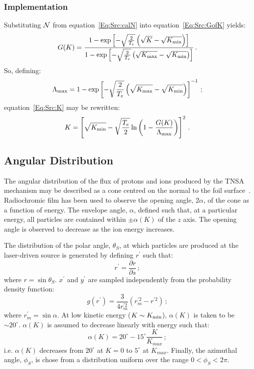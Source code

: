 \subsubsection{Implementation}
Substituting ${\cal N}$ from equation~\ref{Eq:Src:calN} into
equation~\ref{Eq:Src:GofK} yields:
\begin{equation}
  G(K) =
  \frac{1-\exp\left[-\sqrt{\frac{2}{T_e}}\left(\sqrt{K}-\sqrt{K_{\rm min}}\right)\right]}
       {1-\exp\left[-\sqrt{\frac{2}{T_e}}\left(\sqrt{K_{\rm max}}-\sqrt{K_{\rm min}}\right)\right]}\,.
\end{equation}
So, defining:
\begin{equation}
  \Lambda_{\rm max} =
       1-\exp\left[-\sqrt{\frac{2}{T_e}}\left(\sqrt{K_{\rm max}}-\sqrt{K_{\rm min}}\right)\right]^{-1}\,;
\end{equation}
equation~\ref{Eq:Src:K} may be rewritten:
\begin{equation}
  K = \left[ \sqrt{K_{\rm min}} - \sqrt{\frac{T_e}{2}}
             \ln \left( 1 - \frac{G(K)}{\Lambda_{\rm max}} \right)
      \right]^2 \, .
\end{equation}


\subsection{Angular Distribution}

The angular distribution of the flux of protons and ions produced by
the TNSA mechanism may be described as a cone centred on the normal to
the foil surface~\cite{10.1063/1.3086424}.
Radiochromic film has been used to observe the opening angle,
$2\alpha$, of the cone as a function of energy.
The envelope angle, $\alpha$, defined such that, at a particular
energy, all particles are contained within $\pm\alpha(K)$ of
the $z$ axis.
The opening angle is observed to decrease as the ion energy
increases.

The distribution of the polar angle, $\theta_S$, at which particles
are produced at the laser-driven source is generated by defining
$r^\prime$ such that:
\begin{equation}
  r^\prime = \frac{\partial r}{\partial s}\,;
\end{equation}
where $r=\sin\theta_S$.
$x^\prime$ and $y^\prime$ are sampled independently from the
probability density function:
\begin{equation}
  g(r^\prime) = \frac{3}{4r^{\prime 2}_m} \left(r^{\prime 2}_m-r^{\prime 2} \right)\,;
\end{equation}
where $r^\prime_m=\sin\alpha$.
At low kinetic energy ($K \sim K_{\rm min}$),
$\alpha(K)$ is taken to be $\sim 20^\circ$.
$\alpha(K)$ is assumed to decrease linearly with energy such
that:
\begin{equation}
  \alpha(K) =
                20^\circ - 15^\circ \frac{K}{K_{max}} \, ;
  \label{Eq:sigVeps}
\end{equation}
i.e. $\alpha(K)$ decreases from $20^\circ$ at $K=0$
to $5^\circ$ at $K_{max}$.
Finally, the azimuthal angle, $\phi_S$, is chose from a distribution
uniform over the range $0 < \phi_S < 2\pi$.

